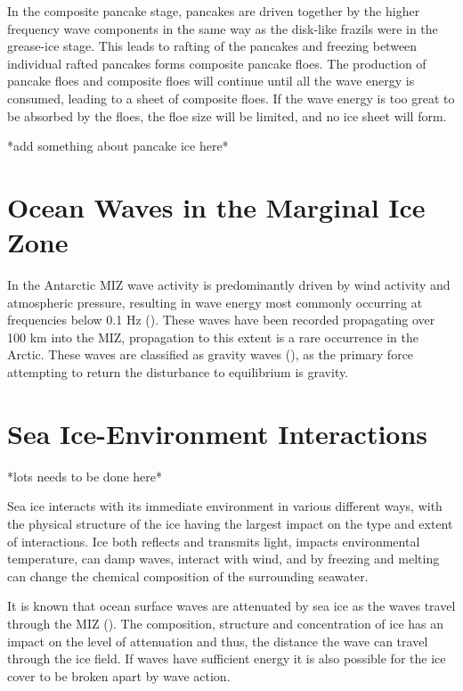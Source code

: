 In the composite pancake stage, pancakes are driven together by the higher frequency wave components in the same way as the disk-like frazils were in the grease-ice stage. This leads to rafting of the pancakes and freezing between individual rafted pancakes forms composite pancake floes. The production of pancake floes and composite floes will continue until all the wave energy is consumed, leading to a sheet of composite floes. If the wave energy is too great to be absorbed by the floes, the floe size will be limited, and no ice sheet will form.

*add something about pancake ice here*

\section{Ocean Waves in the Marginal Ice Zone}
\label{sec:ch2.section3}

In the Antarctic \ac{MIZ} wave activity is predominantly driven by wind activity and atmospheric pressure, resulting in wave energy most commonly occurring at frequencies below 0.1 Hz (\cite{thomsonWavePropagationMarginal2022}). These waves have been recorded propagating over 100 km into the \ac{MIZ}, propagation to this extent is a rare occurrence in the Arctic. These waves are classified as gravity waves (\cite{holthuijsenWavesOceanicCoastal2007}), as the primary force attempting to return the disturbance to equilibrium is gravity.

\section{Sea Ice-Environment Interactions}
\label{sec:ch2.section4}

*lots needs to be done here*

Sea ice interacts with its immediate environment in various different ways, with the physical structure of the ice having the largest impact on the type and extent of interactions.
Ice both reflects and transmits light, impacts environmental temperature, can damp waves, interact with wind, and by freezing and melting can change the chemical composition of the surrounding seawater.

It is known that ocean surface waves are attenuated by sea ice as the waves travel through the \ac{MIZ} (\cite{williamsWaveIceInteractions2013}). The composition, structure and concentration of ice has an impact on the level of attenuation and thus, the distance the wave can travel through the ice field. If waves have sufficient energy it is also possible for the ice cover to be broken apart by wave action.

